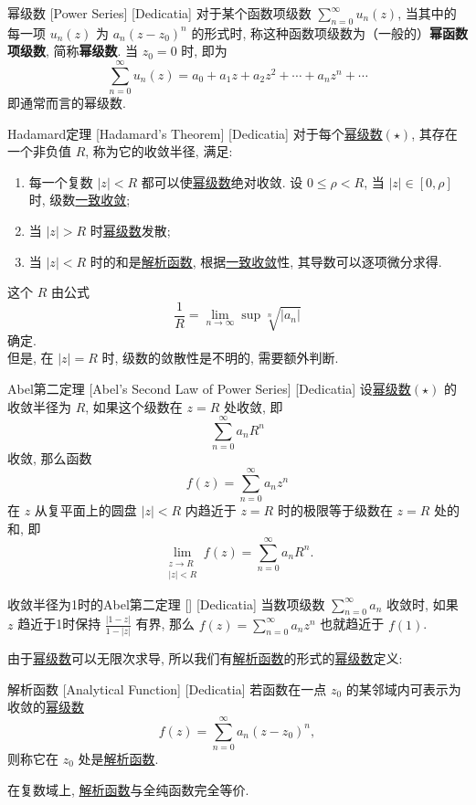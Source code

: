 \documentclass[UTF8]{ctexart}
\newcommand{\AnalyticalFunction}{\hyperref[dfn:AnalyticalFunction]{解析函数}}
\newcommand{\PowerSeries}{\hyperref[dfn:PowerSeries]{幂级数}}
\newcommand{\UniformConvergence}{\hyperref[dfn:UniformConvergence]{一致收敛}}
\begin{document}
\begin{dfn}
    [PowerSeries]
    {幂级数}
    [Power Series]
    [Dedicatia]
    对于某个函数项级数 \( \sum_{n = 0}^{\infty} u_n(z)  \), 当其中的每一项 \( u_n(z) \) 为 \( a_n(z-z_0)^n \) 的形式时, 称这种函数项级数为（一般的）\textbf{幂函数项级数}, 简称\textbf{幂级数}. 当 \( z_0=0 \) 时, 即为
    \[\sum_{n = 0}^{\infty} u_n(z)=a_0+a_1z+a_2z^2+\cdots+a_nz^n+\cdots \tag{ \( \star \) }\]
    即通常而言的幂级数. 
\end{dfn}
\begin{thm}
    [UUID]
    {Hadamard定理}
    [Hadamard's Theorem]
    [Dedicatia]
    对于每个\PowerSeries  \( (\star) \), 其存在一个非负值 \( R \), 称为它的收敛半径, 满足: 
    \begin{enumerate}
        \item 每一个复数 \( |z|<R \) 都可以使\PowerSeries 绝对收敛. 设 \( 0\leqslant\rho <R \), 当 \( |z|\in[0,\rho] \) 时, 级数\UniformConvergence; 
        \item 当 \( |z|>R \) 时\PowerSeries 发散; 
        \item 当 \( |z|<R \) 时的和是\AnalyticalFunction, 根据\UniformConvergence 性, 其导数可以逐项微分求得. 
    \end{enumerate}
    这个 \( R \) 由公式
    \[\frac{1}{R}=\lim_{n\to \infty}\sup\sqrt[n]{|a_n|}\]
    确定. \\
    但是, 在 \( |z|=R \) 时, 级数的敛散性是不明的, 需要额外判断. 
\end{thm}
\begin{thm}
    [UUID]
    {Abel第二定理}
    [Abel's Second Law of Power Series]
    [Dedicatia]
    设\PowerSeries  \( (\star) \) 的收敛半径为 \( R \), 如果这个级数在 \( z = R \) 处收敛, 即
    \[\sum_{n=0}^{\infty} a_n R^n\]
    收敛, 那么函数
    \[f(z) = \sum_{n=0}^{\infty} a_n z^n\]
    在 \( z \) 从复平面上的圆盘 \( |z| < R \) 内趋近于 \( z = R \) 时的极限等于级数在 \( z = R \) 处的和, 即
    \[\lim_{\substack{z \to R \\ |z| < R}} f(z) = \sum_{n=0}^{\infty} a_n R^n.\]
\end{thm}
\begin{xmp}
    [UUID]
    {收敛半径为1时的Abel第二定理}
    []
    [Dedicatia]
    当数项级数 \( \sum\limits_{n=0}^\infty a_n \) 收敛时, 如果 \( z \) 趋近于1时保持 \( \frac{|1-z|}{1-|z|} \) 有界, 那么 \( f(z)=\sum\limits_{n=0}^\infty a_nz^n \) 也就趋近于 \( f(1) \).
\end{xmp}
由于\PowerSeries 可以无限次求导, 所以我们有\AnalyticalFunction 的形式的\PowerSeries 定义: 
\begin{dfn}
    [UUID]
    {解析函数}
    [Analytical Function]
    [Dedicatia]
    若函数在一点 \(z_0\) 的某邻域内可表示为收敛的\PowerSeries   
    \[f(z)=\sum_{n=0}^{\infty}a_n(z-z_0)^n,\]  
    则称它在 \(z_0\) 处是\AnalyticalFunction.   
\end{dfn}
在复数域上, \AnalyticalFunction 与全纯函数完全等价. 
\end{document}
